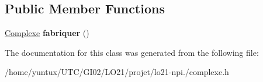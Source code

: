 \subsection*{\-Public \-Member \-Functions}
\begin{DoxyCompactItemize}
\item 
\hypertarget{class_frabrique_complexe_a924fc64934dea36a9841144704cb4696}{\hyperlink{class_complexe}{\-Complexe} {\bfseries fabriquer} ()}\label{class_frabrique_complexe_a924fc64934dea36a9841144704cb4696}

\end{DoxyCompactItemize}


\-The documentation for this class was generated from the following file\-:\begin{DoxyCompactItemize}
\item 
/home/yuntux/\-U\-T\-C/\-G\-I02/\-L\-O21/projet/lo21-\/npi./complexe.\-h\end{DoxyCompactItemize}
